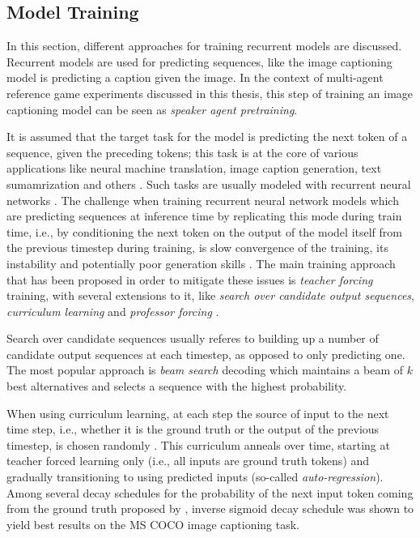 \subsection{Model Training}
\label{model_pretraining}
In this section, different approaches for training recurrent models are discussed. Recurrent models are used for predicting sequences, like the image captioning model is predicting a caption given the image. In the context of multi-agent reference game experiments discussed in this thesis, this step of training an image captioning model can be seen as \emph{speaker agent pretraining}.

It is assumed that the target task for the model is predicting the next token of a sequence, given the preceding tokens; this task is at the core of various applications like neural machine translation, image caption generation, text sumamrization and others \parencite[e.~g.,][]{cho2014learning, sutskever2014sequence}. Such tasks are usually modeled with recurrent neural networks \parencite{rumelhart1986learning}. The challenge when training recurrent neural network models which are predicting sequences at inference time by replicating this mode during train time, i.e., by conditioning the next token on the output of the model itself from the previous timestep during training, is slow convergence of the training, its instability and potentially poor generation skills \parencite{lamb2016professor}. The main training approach that has been proposed in order to mitigate these issues is \textit{teacher forcing} training, with several extensions to it, like \textit{search over candidate output sequences}, \textit{curriculum learning} and \textit{professor forcing} \parencite{goodfellow2016deep, williams1989algorithm}.

Search over candidate sequences usually referes to building up a number of candidate output sequences at each timestep, as opposed to only predicting one. The most popular approach is \textit{beam search} decoding which maintains a beam of $k$ best alternatives and selects a sequence with the highest probability.

When using curriculum learning, at each step the source of input to the next time step, i.e., whether it is the ground truth or the output of the previous timestep, is chosen randomly \parencite{bengio2015scheduled}. This curriculum anneals over time, starting at teacher forced learning only (i.e., all inputs are ground truth tokens) and gradually transitioning to using predicted inputs (so-called \textit{auto-regression}). Among several decay schedules for the probability of the next input token coming from the ground truth proposed by \cite{bengio2015scheduled}, inverse sigmoid decay schedule  was shown to yield best results on the MS COCO image captioning task.

